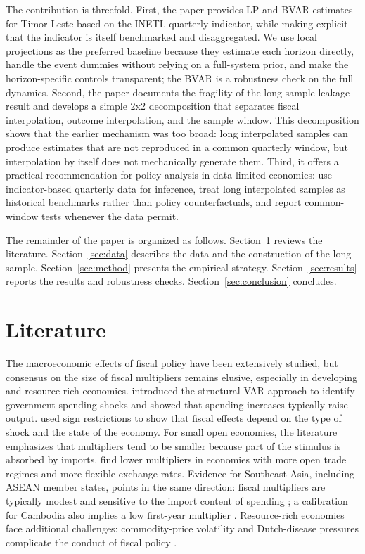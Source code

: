 \documentclass[11pt,a4paper]{article}
\begin{document}
The contribution is threefold. First, the paper provides LP and BVAR estimates for Timor-Leste based on the INETL quarterly indicator, while making explicit that the indicator is itself benchmarked and disaggregated. We use local projections as the preferred baseline because they estimate each horizon directly, handle the event dummies without relying on a full-system prior, and make the horizon-specific controls transparent; the BVAR is a robustness check on the full dynamics. Second, the paper documents the fragility of the long-sample leakage result and develops a simple 2x2 decomposition that separates fiscal interpolation, outcome interpolation, and the sample window. This decomposition shows that the earlier mechanism was too broad: long interpolated samples can produce estimates that are not reproduced in a common quarterly window, but interpolation by itself does not mechanically generate them. Third, it offers a practical recommendation for policy analysis in data-limited economies: use indicator-based quarterly data for inference, treat long interpolated samples as historical benchmarks rather than policy counterfactuals, and report common-window tests whenever the data permit.

The remainder of the paper is organized as follows. Section~\ref{sec:literature} reviews the literature. Section~\ref{sec:data} describes the data and the construction of the long sample. Section~\ref{sec:method} presents the empirical strategy. Section~\ref{sec:results} reports the results and robustness checks. Section~\ref{sec:conclusion} concludes.

\section{Literature}
\label{sec:literature}

The macroeconomic effects of fiscal policy have been extensively studied, but consensus on the size of fiscal multipliers remains elusive, especially in developing and resource-rich economies. \textcite{blanchard2002} introduced the structural VAR approach to identify government spending shocks and showed that spending increases typically raise output. \textcite{mountford2009} used sign restrictions to show that fiscal effects depend on the type of shock and the state of the economy. For small open economies, the literature emphasizes that multipliers tend to be smaller because part of the stimulus is absorbed by imports. \textcite{ilzetzki2013} find lower multipliers in economies with more open trade regimes and more flexible exchange rates. Evidence for Southeast Asia, including ASEAN member states, points in the same direction: fiscal multipliers are typically modest and sensitive to the import content of spending \parencite{tang2013,dime2021}; a calibration for Cambodia also implies a low first-year multiplier \parencite{baksa2020}. Resource-rich economies face additional challenges: commodity-price volatility and Dutch-disease pressures complicate the conduct of fiscal policy \parencite{frankel2012}.
\end{document}

